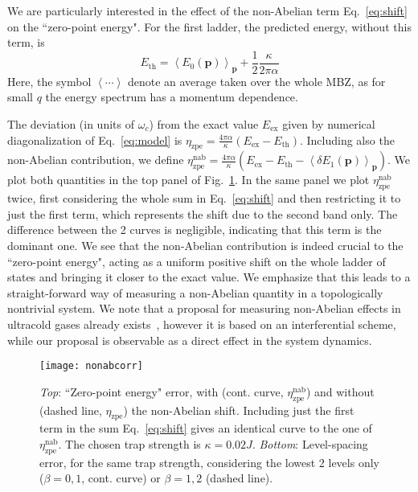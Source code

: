 \documentclass[twocolumn, 10pt, aps, superscriptaddress, floatfix, showpacs, pra, citeautoscript]{revtex4-1}
\newcommand{\vt}[1]{\mathbf{#1}}
\begin{document}
We are particularly interested in the effect of the non-Abelian term
Eq.~\eqref{eq:shift} on the ``zero-point energy". For the first
ladder, the predicted energy, without this term, is
\begin{equation}
  E_{\text{th}} = \left<E_0(\vt{p})\right>_{\vt{p}} + \frac{1}{2}\frac{\kappa}{2\pi\alpha}
\end{equation}
Here, the symbol $\left<\cdots\right>$ denote an average taken over
the whole MBZ, as for small $q$ the energy spectrum has a momentum
dependence.

The deviation (in units of $\omega_c$) from the exact value
$E_{\text{ex}}$ given by numerical diagonalization of
Eq.~\eqref{eq:model} is
$\eta_{\text{zpe}} = \frac{4\pi\alpha}{\kappa} (E_{\text{ex}} -
E_{\text{th}})$.
Including also the non-Abelian contribution, we define
$\eta_{\text{zpe}}^{\text{nab}} = \frac{4\pi\alpha}{\kappa}
(E_{\text{ex}} - E_{\text{th}} - \left<\delta
  E_1(\vt{p})\right>_{\vt{p}})$.
We plot both quantities in the top panel of Fig.~\ref{fig:zpe}. In the
same panel we plot $\eta_{\text{zpe}}^{\text{nab}}$ twice, first
considering the whole sum in Eq.~\eqref{eq:shift} and then restricting
it to just the first term, which represents the shift due to the
second band only. The difference between the 2 curves is negligible,
indicating that this term is the dominant one.  We see that the
non-Abelian contribution is indeed crucial to the ``zero-point
energy", acting as a uniform positive shift on the whole ladder of
states and bringing it closer to the exact value. We emphasize that
this leads to a straight-forward way of measuring a non-Abelian
quantity in a topologically nontrivial system. We note that a proposal
for measuring non-Abelian effects in ultracold gases already
exists~\cite{Grusdt2014nonabelian}, however it is based on an
interferential scheme, while our proposal is observable as a direct
effect in the system dynamics.

\begin{figure}[htb]\centering
  \texttt{[image: nonabcorr]} %
  \caption{\emph{Top}: ``Zero-point energy" error, with (cont. curve,
    $\eta_{\text{zpe}}^{\text{nab}}$) and without (dashed line,
    $\eta_{\text{zpe}}$) the non-Abelian shift. Including just the
    first term in the sum Eq.~\eqref{eq:shift} gives an identical
    curve to the one of $\eta_{\text{zpe}}^{\text{nab}}$. The chosen
    trap strength is $\kappa = 0.02 J$.  \emph{Bottom}: Level-spacing
    error, for the same trap strength, considering the lowest 2 levels
    only ($\beta = 0,1$, cont. curve) or $\beta = 1,2$ (dashed line).}
  \label{fig:zpe}
\end{figure}
\end{document}
